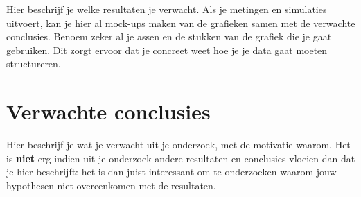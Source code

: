 Hier beschrijf je welke resultaten je verwacht. Als je metingen en simulaties uitvoert, kan je hier al mock-ups maken van de grafieken samen met de verwachte conclusies. Benoem zeker al je assen en de stukken van de grafiek die je gaat gebruiken. Dit zorgt ervoor dat je concreet weet hoe je je data gaat moeten structureren.

\section{Verwachte conclusies}
\label{sec:verwachte_conclusies}

Hier beschrijf je wat je verwacht uit je onderzoek, met de motivatie waarom. Het is \textbf{niet} erg indien uit je onderzoek andere resultaten en conclusies vloeien dan dat je hier beschrijft: het is dan juist interessant om te onderzoeken waarom jouw hypothesen niet overeenkomen met de resultaten.

